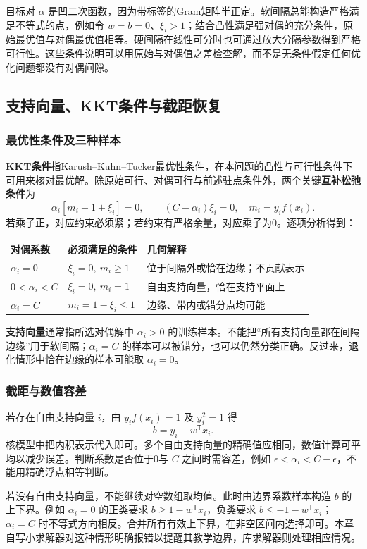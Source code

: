 \documentclass[UTF8,fontset=none,zihao=-4,a4paper]{ctexart}
\newcommand{\term}[1]{\textbf{#1}}
\numberwithin{equation}{section}
\numberwithin{figure}{section}
\begin{document}
目标对 $\alpha$ 是凹二次函数，因为带标签的Gram矩阵半正定。软间隔总能构造严格满足不等式的点，例如令 $w=b=0$、$\xi_i>1$；结合凸性满足强对偶的充分条件，原始最优值与对偶最优值相等。硬间隔在线性可分时也可通过放大分隔参数得到严格可行性。这些条件说明可以用原始与对偶值之差检查解，而不是无条件假定任何优化问题都没有对偶间隙。

\subsection{支持向量、KKT条件与截距恢复}
\subsubsection{最优性条件及三种样本}
\term{KKT条件}指Karush--Kuhn--Tucker最优性条件，在本问题的凸性与可行性条件下可用来核对最优解。除原始可行、对偶可行与前述驻点条件外，两个关键\term{互补松弛条件}为
\[
 \alpha_i[m_i-1+\xi_i]=0,\qquad
 (C-\alpha_i)\xi_i=0,
 \quad m_i=y_if(x_i).
\]
若乘子正，对应约束必须紧；若约束有严格余量，对应乘子为0。逐项分析得到：
\begin{center}\small
\begin{tabularx}{\linewidth}{lYY}\toprule
对偶系数 & 必须满足的条件 & 几何解释\\\midrule
$\alpha_i=0$ & $\xi_i=0,\ m_i\ge1$ & 位于间隔外或恰在边缘；不贡献表示\\
$0<\alpha_i<C$ & $\xi_i=0,\ m_i=1$ & 自由支持向量，恰在支持平面上\\
$\alpha_i=C$ & $m_i=1-\xi_i\le1$ & 边缘、带内或错分点均可能\\\bottomrule
\end{tabularx}\end{center}
\term{支持向量}通常指所选对偶解中 $\alpha_i>0$ 的训练样本。不能把“所有支持向量都在间隔边缘”用于软间隔；$\alpha_i=C$ 的样本可以被错分，也可以仍然分类正确。反过来，退化情形中恰在边缘的样本可能取 $\alpha_i=0$。

\subsubsection{截距与数值容差}
若存在自由支持向量 $i$，由 $y_if(x_i)=1$ 及 $y_i^2=1$ 得
\[
 b=y_i-w^{\mathsf T}x_i.
\]
核模型中把内积表示代入即可。多个自由支持向量的精确值应相同，数值计算可平均以减少误差。判断系数是否位于0与 $C$ 之间时需容差，例如 $\epsilon<\alpha_i<C-\epsilon$，不能用精确浮点相等判断。

若没有自由支持向量，不能继续对空数组取均值。此时由边界系数样本构造 $b$ 的上下界。例如 $\alpha_i=0$ 的正类要求 $b\ge1-w^{\mathsf T}x_i$，负类要求 $b\le-1-w^{\mathsf T}x_i$；$\alpha_i=C$ 时不等式方向相反。合并所有有效上下界，在非空区间内选择即可。本章自写小求解器对这种情形明确报错以提醒其教学边界，库求解器则处理相应情况。
\end{document}
